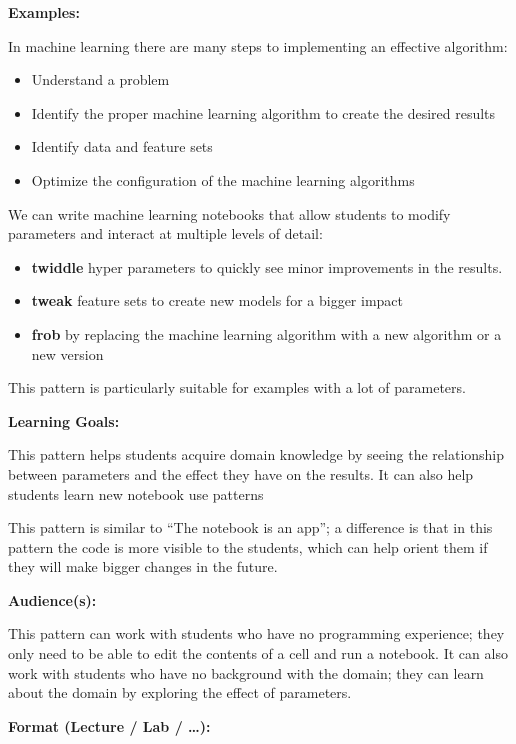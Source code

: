 \documentclass[]{book}
\providecommand{\tightlist}{%
  \setlength{\itemsep}{0pt}\setlength{\parskip}{0pt}}
\begin{document}
\textbf{Examples:}

In machine learning there are many steps to implementing an effective
algorithm:

\begin{itemize}
\tightlist
\item
  Understand a problem
\item
  Identify the proper machine learning algorithm to create the desired
  results
\item
  Identify data and feature sets
\item
  Optimize the configuration of the machine learning algorithms
\end{itemize}

We can write machine learning notebooks that allow students to modify
parameters and interact at multiple levels of detail:

\begin{itemize}
\tightlist
\item
  \textbf{twiddle} hyper parameters to quickly see minor improvements in
  the results.
\item
  \textbf{tweak} feature sets to create new models for a bigger impact
\item
  \textbf{frob} by replacing the machine learning algorithm with a new
  algorithm or a new version
\end{itemize}

This pattern is particularly suitable for examples with a lot of
parameters.

\textbf{Learning Goals:}

This pattern helps students acquire domain knowledge by seeing the
relationship between parameters and the effect they have on the results.
It can also help students learn new notebook use patterns

This pattern is similar to ``The notebook is an app''; a difference is
that in this pattern the code is more visible to the students, which can
help orient them if they will make bigger changes in the future.

\textbf{Audience(s):}

This pattern can work with students who have no programming experience;
they only need to be able to edit the contents of a cell and run a
notebook. It can also work with students who have no background with the
domain; they can learn about the domain by exploring the effect of
parameters.

\textbf{Format (Lecture / Lab / \ldots{}):}
\end{document}
